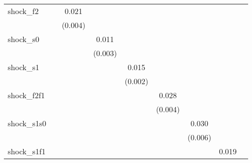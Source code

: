 {\begin{tabular}{l*{8}{c}}
\addlinespace
shock\_f2    &                     &       0.021\sym{***}&                     &                     &                     &                     &                     &                     \\
            &                     &     (0.004)         &                     &                     &                     &                     &                     &                     \\
\addlinespace
shock\_s0    &                     &                     &       0.011\sym{***}&                     &                     &                     &                     &                     \\
            &                     &                     &     (0.003)         &                     &                     &                     &                     &                     \\
\addlinespace
shock\_s1    &                     &                     &                     &       0.015\sym{***}&                     &                     &                     &                     \\
            &                     &                     &                     &     (0.002)         &                     &                     &                     &                     \\
\addlinespace
shock\_f2f1  &                     &                     &                     &                     &       0.028\sym{***}&                     &                     &                     \\
            &                     &                     &                     &                     &     (0.004)         &                     &                     &                     \\
\addlinespace
shock\_s1s0  &                     &                     &                     &                     &                     &       0.030\sym{***}&                     &                     \\
            &                     &                     &                     &                     &                     &     (0.006)         &                     &                     \\
\addlinespace
shock\_s1f1  &                     &                     &                     &                     &                     &                     &       0.019\sym{***}&                     \\

\end{tabular}}
